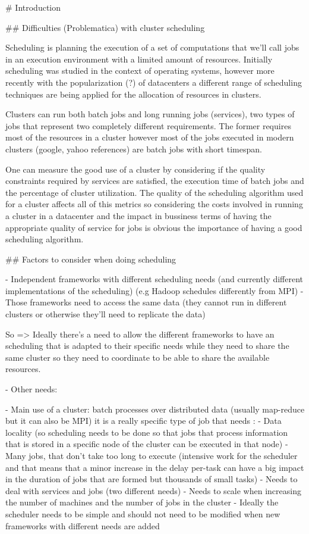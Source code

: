 
# Introduction

## Difficulties (Problematica) with cluster scheduling

Scheduling is planning the execution of a
set of computations that we'll call jobs in an execution environment
with a limited amount of resources. Initially scheduling was studied
in the context of operating systems, however more recently with the
popularization (?) of datacenters a different range of scheduling
techniques are being applied for the allocation of resources in
clusters. 

Clusters can run both batch jobs and long running jobs (services), two
types of jobs that represent two completely different requirements.
The former requires most of the resources in a cluster however most of
the jobs executed in modern clusters (google, yahoo references) are
batch jobs with short timespan.

One can measure the good use of a cluster by considering if the
quality constraints required by services are satisfied, the execution
time of batch jobs and the percentage of cluster utilization. The
quality of the scheduling algorithm used for a cluster affects all of
this metrics so considering the costs involved in running a cluster in
a datacenter and the impact in bussiness terms of having the
appropriate quality of service for jobs is obvious the importance of
having a good scheduling algorithm. 


## Factors to consider when doing scheduling

- Independent frameworks with different scheduling needs (and
  currently different implementations  of the scheduling) (e.g Hadoop
  schedules differently from MPI)
- Those frameworks need to access the same data (they cannot run in
different clusters or otherwise they'll need to replicate the data)

So => Ideally there's a need to allow the different frameworks to have an
scheduling that is adapted to their specific needs while they need to
share the same cluster so they need to coordinate to be able to share
the available resources.

- Other needs:

 - Main use of a cluster: batch processes over distributed data
   (usually map-reduce but it can also be MPI) it is a really specific
   type of job that needs :
     - Data locality (so scheduling needs to be done so that jobs that
     process information that is stored in a specific node of the
     cluster can be executed in that node)
     - Many jobs, that don't take too long to execute (intensive work
     for the scheduler and that means that a minor increase in the
     delay per-task can have a big impact in the duration of jobs that
     are formed but thousands of small tasks)
 - Needs to deal with services and jobs (two different needs)
 - Needs to scale when increasing the number of machines and the
   number of jobs in the cluster
 - Ideally the scheduler needs to be simple and should not need to be
   modified when new frameworks with different needs are added

